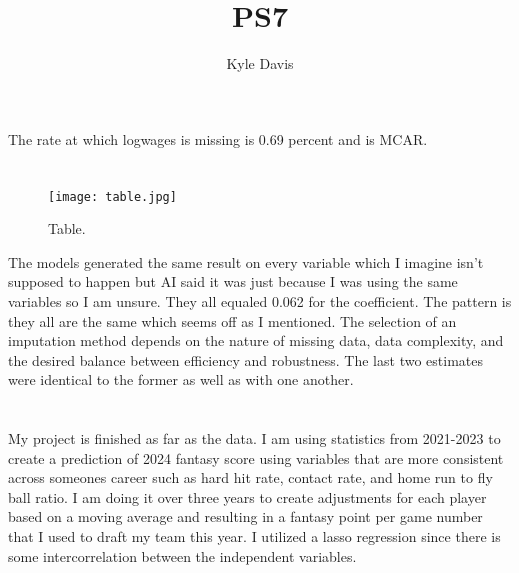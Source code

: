 \documentclass{article}
\title{PS7}
\author{Kyle Davis}
\begin{document}
\maketitle



\section{}

The rate at which logwages is missing is 0.69 percent and is MCAR.

\section{}

\begin{figure}
\texttt{[image: table.jpg]}
\caption{\label{fig:table}Table.}
\end{figure}

The models generated the same result on every variable which I imagine isn't supposed to happen but AI said it was just because I was using the same variables so I am unsure. They all equaled 0.062 for the coefficient. The pattern is they all are the same which seems off as I mentioned. 
The selection of an imputation method depends on the nature of missing data, data complexity, and the desired balance between efficiency and robustness.
The last two estimates were identical to the former as well as with one another.

\section{}
My project is finished as far as the data. I am using statistics from 2021-2023 to create a prediction of 2024 fantasy score using variables that are more consistent across someones career such as hard hit rate, contact rate, and home run to fly ball ratio. I am doing it over three years to create adjustments for each player based on a moving average and resulting in a fantasy point per game number that I used to draft my team this year. I utilized a lasso regression since there is some intercorrelation between the independent variables. 
\end{document}

